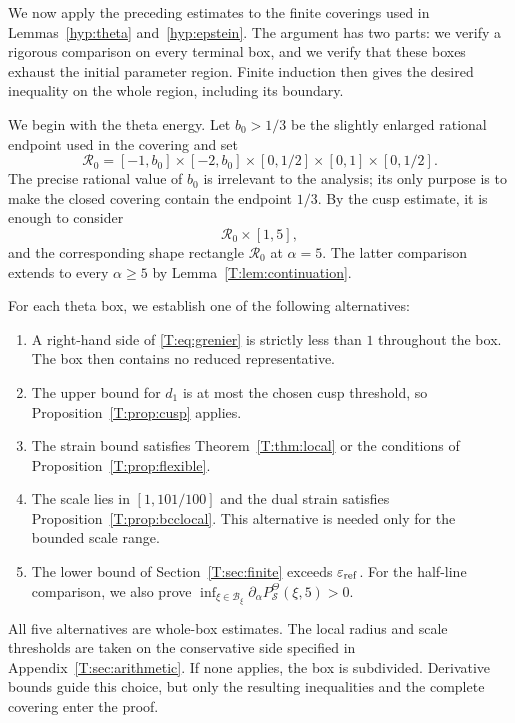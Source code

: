 \documentclass[reqno,english]{amsart}
\theoremstyle{definition}
\newtheorem{open problem}[theorem]{Open Problem}
\theoremstyle{remark}
\theoremstyle{plain}
\numberwithin{equation}{section}
\begin{document}
We now apply the preceding estimates to the finite coverings used in
Lemmas~\ref{hyp:theta} and~\ref{hyp:epstein}. The argument has two parts:
we verify a rigorous comparison on every terminal box, and we verify that
these boxes exhaust the initial parameter region. Finite induction then
gives the desired inequality on the whole region, including its boundary.

We begin with the theta energy. Let $b_0>1/3$ be the slightly enlarged
rational endpoint used in the covering and set
\[
 \mathcal R_0=[-1,b_0]\times[-2,b_0]\times[0,1/2]\times[0,1]\times[0,1/2].
\]
The precise rational value of $b_0$ is irrelevant to the analysis; its
only purpose is to make the closed covering contain the endpoint $1/3$.
By the cusp estimate, it is enough to consider
\begin{equation}\label{T:eq:compactroot}
 \mathcal R_0\times[1,5],
\end{equation}
and the corresponding shape rectangle $\mathcal R_0$ at $\alpha=5$.
The latter comparison extends to every $\alpha\ge5$ by
Lemma~\ref{T:lem:continuation}.

For each theta box, we establish one of the following alternatives:
\begin{enumerate}[label=\textup{(\arabic*)},leftmargin=2em]
\item A right-hand side of \eqref{T:eq:grenier} is strictly less than
$1$ throughout the box. The box then contains no reduced representative.
\item The upper bound for $d_1$ is at most the chosen cusp threshold,
so Proposition~\ref{T:prop:cusp} applies.
\item The strain bound satisfies Theorem~\ref{T:thm:local} or the
conditions of Proposition~\ref{T:prop:flexible}.
\item The scale lies in $[1,101/100]$ and the dual strain satisfies
Proposition~\ref{T:prop:bcclocal}. This alternative is needed only
for the bounded scale range.
\item The lower bound of Section~\ref{T:sec:finite} exceeds
$\varepsilon_{\rm ref}$. For the half-line comparison, we also prove
$\inf_{\xi\in\mathcal B_\xi}\partial_\alpha
P^\Theta_{\mathcal S}(\xi,5)>0$.
\end{enumerate}
All five alternatives are whole-box estimates. The local radius and
scale thresholds are taken on the conservative side specified in
Appendix~\ref{T:sec:arithmetic}. If none applies, the box is subdivided.
Derivative bounds guide this choice, but only the resulting inequalities
and the complete covering enter the proof.
\end{document}
